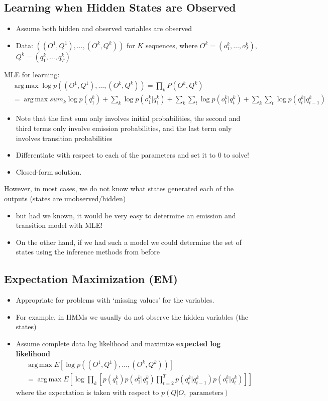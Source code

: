 \documentclass[10pt]{article}
\DeclareMathOperator*{\argmax}{arg\,max}
\begin{document}
\subsection*{Learning when Hidden States are Observed}
\begin{itemize}
	\item Assume both hidden and observed variables are observed
	\item Data: $((O^1, Q^1), \dots, (O^k, Q^k))$ for $K$ sequences, where $O^k = (o_1^k, \dots, o_T^k)$, $Q^k = (q_1^k, \dots, q_T^k)$
\end{itemize}
MLE for learning:
\begin{align*}
&\argmax \log p((O^1, Q^1), \dots, (O^k, Q^k)) = \prod_k P(O^k, Q^k) \\
&= \argmax sum_k \log p(q_1^k) + \sum_k \log p(o_1^k | q_1^k) + \sum_k \sum_t \log p(o_t^k | q_t^k) + \sum_k \sum_t \log p(q_t^k | q_{t - 1}^k)
\end{align*}
\begin{itemize}
	\item Note that the first sum only involves initial probabilities, the second and third terms only involve emission probabilities, and the last term only involves transition probabilities
	\item Differentiate with respect to each of the parameters and set it to 0 to solve!
	\item Closed-form solution.
\end{itemize}
However, in most cases, we do not know what states generated each of the outputs (states are unobserved/hidden)
\begin{itemize}
	\item but had we known, it would be very easy to determine an emission and transition model with MLE!
	\item On the other hand, if we had such a model we could determine the set of states using the inference methods from before
\end{itemize}

\subsection*{Expectation Maximization (EM)}
\begin{itemize}
	\item Appropriate for problems with `missing values' for the variables.
	\item For example, in HMMs we usually do not observe the hidden variables (the states)
	\item Assume complete data log likelihood and maximize \textbf{expected log likelihood}
	\begin{align*}
        &\argmax E[\log p((O^1, Q^1), \dots, (O^k, Q^k))] \\
        &= \argmax E\left[\log \prod_k \left[p(q_1^k) p(o_1^k | q_1^k) \prod_{t = 2}^T p(q_t^k | q_{t - 1}^k) p(o_t^k | q_t^k)\right]\right]
    \end{align*}
    where the expectation is taken with respect to $p(Q | O, \text{ parameters})$
\end{itemize}
\end{document}
